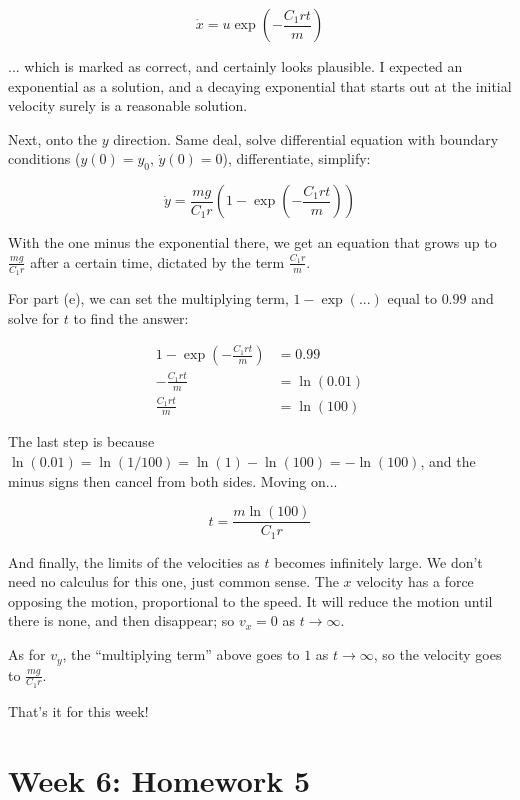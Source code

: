 \documentclass[12pt,a4paper]{report}
\begin{document}
\begin{equation}
\dot{x} = u \exp\left(-\frac{C_1 r t}{m}\right)
\end{equation}

... which is marked as correct, and certainly looks plausible. I expected an exponential as a solution, and a decaying exponential that starts out at the initial velocity surely is a reasonable solution.

Next, onto the $y$ direction. Same deal, solve differential equation with boundary conditions ($y(0) = y_0$, $\dot{y}(0) = 0$), differentiate, simplify:

\begin{equation}
\dot{y} = \frac{m g}{C_1 r} \left(1 - \exp\left(-\frac{C_1 r t}{m}\right) \right)
\end{equation}

With the one minus the exponential there, we get an equation that grows up to $\displaystyle \frac{m g}{C_1 r}$ after a certain time, dictated by the term $\displaystyle \frac{C_1 r}{m}$.

For part (e), we can set the multiplying term, $1 - \exp(...)$ equal to $0.99$ and solve for $t$ to find the answer:

\begin{align}
1 - \exp\left(-\frac{C_1 r t}{m}\right) &= 0.99\\
-\frac{C_1 r t}{m} &= \ln(0.01)\\
\frac{C_1 r t}{m} &= \ln(100) 
\end{align}

The last step is because $\ln(0.01) = \ln(1/100) = \ln (1) - \ln(100) = -\ln(100)$, and the minus signs then cancel from both sides. Moving on...

\begin{equation}
t = \frac{m \ln(100)}{C_1 r}
\end{equation}

And finally, the limits of the velocities as $t$ becomes infinitely large. We don't need no calculus for this one, just common sense. The $x$ velocity has a force opposing the motion, proportional to the speed. It will reduce the motion until there is none, and then disappear; so $v_x = 0$ as $t \to \infty$.

As for $v_y$, the ``multiplying term'' above goes to $1$ as $t \to \infty$, so the velocity goes to $\displaystyle \frac{m g}{C_1 r}$.

That's it for this week!

\chapter{Week 6: Homework 5}
\end{document}
